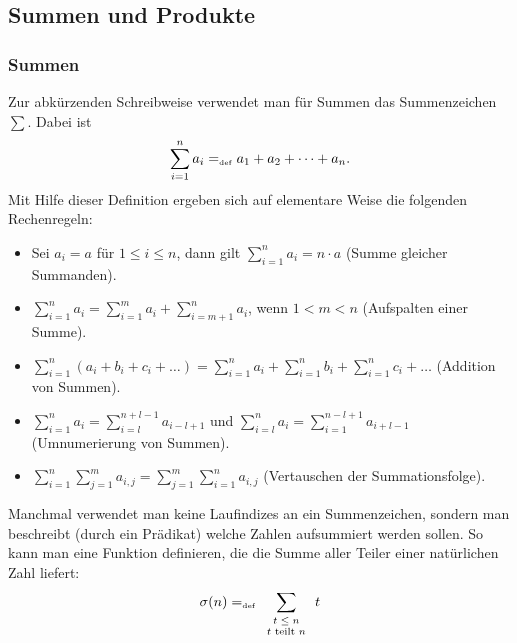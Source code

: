 \subsection{Summen und Produkte}

\subsubsection{Summen}
Zur abkürzenden Schreibweise verwendet man für Summen das
Summenzeichen $\sum$\index{$\sum$}. Dabei ist
\begin{displaymath}
\sum_{i=1}^n a_i =_{\mathrm{\scriptscriptstyle def}} a_1 + a_2 + \dots + a_n.
\end{displaymath}
Mit Hilfe dieser Definition ergeben sich auf elementare Weise die
folgenden Rechenregeln:
\begin{itemize}
%
\item Sei $a_i = a$ für $1 \le i \le n$, dann gilt $\sum\limits_{i=1}^n a_i =
  n \cdot a$ (Summe gleicher Summanden).
%
\item $\sum\limits_{i=1}^n a_i = \sum\limits_{i=1}^m a_i +
  \sum\limits_{i = m + 1}^n a_i$, wenn $1 < m < n$ (Aufspalten einer Summe).
%
\item $\sum\limits_{i=1}^n (a_i + b_i + c_i + \dots) =
  \sum\limits_{i=1}^n a_i + \sum\limits_{i=1}^n b_i +
  \sum\limits_{i=1}^n c_i + \dots$ (Addition von Summen).
%
\item $\sum\limits_{i=1}^n a_i = \sum\limits_{i=l}^{n + l - 1} a_{i-l+1}$
  und $\sum\limits_{i=l}^n a_i = \sum\limits_{i=1}^{n - l + 1} a_{i + l
  - 1}$
  (Umnumerierung von Summen).
%
\item $\sum\limits_{i=1}^n \sum\limits_{j=1}^m a_{i,j} =
  \sum\limits_{j=1}^m \sum\limits_{i=1}^n a_{i,j}$ (Vertauschen der Summationsfolge).
%
\end{itemize}
Manchmal verwendet man keine Laufindizes an ein Summenzeichen, sondern man beschreibt 
(durch ein Prädikat) welche Zahlen aufsummiert werden sollen. So kann man eine Funktion definieren,
die die Summe aller Teiler einer natürlichen Zahl liefert:
\begin{displaymath}
\sigma(n) =_{\mathrm{\scriptscriptstyle def}} \sum\limits_{\scriptsize\begin{array}{c}t \le n\\t \text{ teilt } n\end{array}} t
\end{displaymath}

